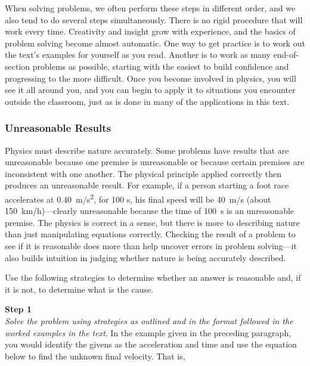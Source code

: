 \documentclass[dvipsnames]{article}
\begin{document}
\vspace{1em}

When solving problems, we often perform these steps in different order, and we also tend to do several steps simultaneously. There is no rigid procedure that will work every time. Creativity and insight grow with experience, and the basics of problem solving become almost automatic. One way to get practice is to work out the text's examples for yourself as you read. Another is to work as many end-of-section problems as possible, starting with the easiest to build confidence and progressing to the more difficult. Once you become involved in physics, you will see it all around you, and you can begin to apply it to situations you encounter outside the classroom, just as is done in many of the applications in this text.

\subsubsection*{Unreasonable Results}

Physics must describe nature accurately. Some problems have results that are unreasonable because one premise is unreasonable or because certain premises are inconsistent with one another. The physical principle applied correctly then produces an unreasonable result. For example, if a person starting a foot race accelerates at \SI{0.40}{m/s^2}, for 100 s, his final speed will be \SI{40}{m/s} (about \SI{150}{km/h})---clearly unreasonable because the time of \SI{100}{s} is an unreasonable premise. The physics is correct in a sense, but there is more to describing nature than just manipulating equations correctly. Checking the result of a problem to see if it is reasonable does more than help uncover errors in problem solving---it also builds intuition in judging whether nature is being accurately described.

\vspace{1em}

Use the following strategies to determine whether an answer is reasonable and, if it is not, to determine what is the cause.

\vspace{1em}

\textbf{Step 1}\\
\textit{Solve the problem using strategies as outlined and in the format followed in the worked examples in the text}. In the example given in the preceding paragraph, you would identify the givens as the acceleration and time and use the equation below to find the unknown final velocity. That is,
\end{document}
